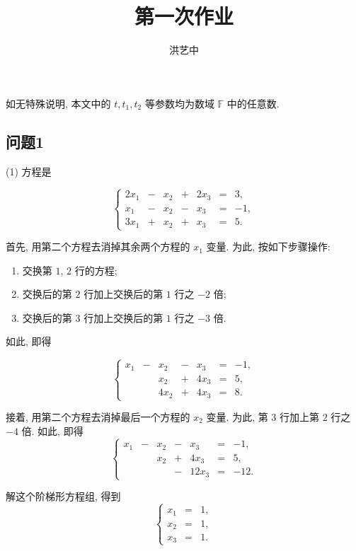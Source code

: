 \title{第一次作业}
\author{洪艺中}
\maketitle
如无特殊说明, 本文中的 $t, t_1, t_2$ 等参数均为数域 $\mathbb{F}$ 中的任意数.
\subsection*{问题1}
(1) 方程是

\[
\left\{
\begin{alignedat}{5}
2x_1 &{}-{}& x_2 &{}+{}& 2x_3 &{}={} & 3, \\
x_1  &{}-{}& x_2 &{}-{}& x_3  &{}={} & -1, \\
3x_1 &{}+{}& x_2 &{}+{}& x_3  &{}={} & 5.
\end{alignedat}
\right.
\]

首先, 用第二个方程去消掉其余两个方程的 $x_1$ 变量. 为此, 按如下步骤操作:
\begin{enumerate}
    \item 交换第 $1$, $2$ 行的方程;
    \item 交换后的第 $2$ 行加上交换后的第 $1$ 行之 $-2$ 倍;
    \item 交换后的第 $3$ 行加上交换后的第 $1$ 行之 $-3$ 倍.
\end{enumerate}

如此, 即得

\[
    \left\{
    \begin{alignedat}{5}
    x_1  &{}-{}&  x_2 &{}-{}& x_3  &{}={} & -1, \\
         &{} {}&  x_2 &{}+{}& 4x_3 &{}={} & 5, \\
         &{} {}& 4x_2 &{}+{}& 4x_3 &{}={} & 8.
    \end{alignedat}
    \right.
\]

接着, 用第二个方程去消掉最后一个方程的 $x_2$ 变量. 为此, 第 $3$ 行加上第 $2$ 行之 $-4$ 倍. 如此, 即得
\[
    \left\{
    \begin{alignedat}{5}
    x_1  &{}-{}&  x_2 &{}-{}& x_3  &{}={} & -1, \\
         &{} {}&  x_2 &{}+{}& 4x_3 &{}={} & 5, \\
         &{} {}&      &{}-{}& 12x_3 &{}={} & -12.
    \end{alignedat}
    \right.
\]

解这个阶梯形方程组, 得到
\[
    \left\{
    \begin{aligned}
    x_1 &{}={} & 1, \\
    x_2 &{}={} & 1, \\
    x_3 &{}={} & 1.
    \end{aligned}
    \right.
\]

